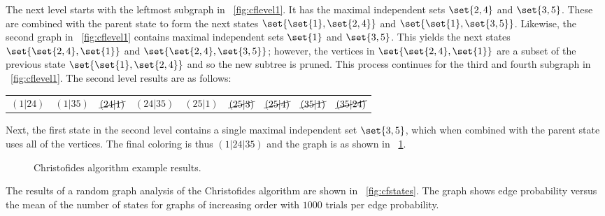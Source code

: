 The next level starts with the leftmost subgraph in \figurename~\ref{fig:cflevel1}.  It has the maximal independent
sets \(\set{2,4}\) and \(\set{3,5}\).  These are combined with the parent state to form the next states
\(\set{\set{1},\set{2,4}}\) and \(\set{\set{1},\set{3,5}}\).  Likewise, the second graph in
\figurename~\ref{fig:cflevel1} contains maximal independent sets \(\set{1}\) and \(\set{3,5}\).  This yields the
next states \(\set{\set{2,4},\set{1}}\) and \(\set{\set{2,4},\set{3,5}}\); however, the vertices in
\(\set{\set{2,4},\set{1}}\) are a subset of the previous state \(\set{\set{1},\set{2,4}}\) and so the new subtree
is pruned.  This process continues for the third and fourth subgraph in \figurename~\ref{fig:cflevel1}.  The second
level results are as follows:

\begin{tabular}{ccccccccc}
  \((1|24)\) & \((1|35)\) & \(\cancel{(24|1)}\) & \((24|35)\) & \((25|1)\) & \(\cancel{(25|3)}\) &
  \(\cancel{(25|4)}\) & \(\cancel{(35|1)}\) & \(\cancel{(35|24)}\)
\end{tabular}

Next, the first state in the second level contains a single maximal independent set \(\set{3,5}\), which when
combined with the parent state uses all of the vertices.  The final coloring is thus \((1|24|35)\) and the graph is
 as shown in \figurename~\ref{fig:cfresults}.

\begin{figure}[H]
  \centering
  \caption{Christofides algorithm example results.}
  \label{fig:cfresults}
\end{figure}

The results of a random graph analysis of the Christofides algorithm are shown in \figurename~\ref{fig:cfstates}.
The graph shows edge probability versus the mean of the number of states for graphs of increasing order with
\(1000\) trials per edge probability.

